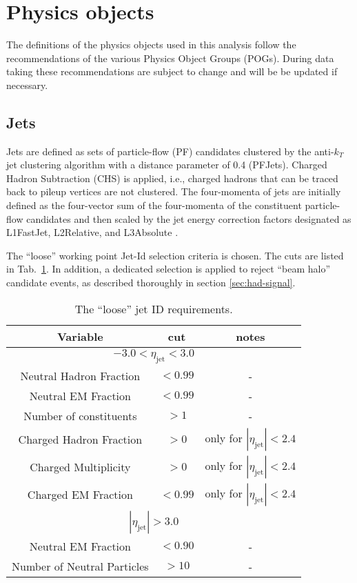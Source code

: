 \section{Physics objects}
\label{sec:objects}
The definitions of the physics objects used in this analysis follow the recommendations of the various Physics Object Groups (POGs). 
During data taking these recommendations are subject to change and will be be updated if necessary.

\subsection{Jets}
\label{sec:jetreco}
Jets are defined as sets of particle-flow (PF) candidates clustered by the
anti-$k_{T}$ jet clustering algorithm \cite{Cacciari:2008gp} with a distance parameter of 0.4
(PFJets). Charged Hadron Subtraction (CHS) is applied, i.e., charged
hadrons that can be traced back to pileup vertices are not clustered.
The four-momenta of jets are initially defined as the four-vector sum of
the four-momenta of the constituent particle-flow candidates and then
scaled by the jet energy correction factors designated as L1FastJet,
L2Relative, and L3Absolute \cite{Chatrchyan:2011ds}.

The ``loose'' working point Jet-Id selection criteria is chosen. 
The cuts are listed in Tab.~\ref{tab:loose-jet-id}. 
In addition, a dedicated selection is applied to reject ``beam halo'' candidate events, 
as described thoroughly in section \ref{sec:had-signal}.

\begin{table}[ht!]
  \caption{The ``loose'' jet ID requirements. \label{tab:loose-jet-id}}
  \centering
  \begin{tabular}{ ccc }
    \hline
    \hline
    Variable & cut & notes \\ \hline
    \multicolumn{3}{c}{$-3.0 < \eta_{\mathrm{jet}} < 3.0$} \\ \hline    
    Neutral Hadron Fraction & $<0.99$ & - \\
    Neutral EM Fraction & $<0.99$ & - \\
    Number of constituents & $>1$ & - \\
    Charged Hadron Fraction & $>0$ & only for $|\eta_{\mathrm{jet}}| < 2.4$ \\
    Charged Multiplicity & $>0$ & only for $|\eta_{\mathrm{jet}}| < 2.4$ \\
    Charged EM Fraction & $<0.99$ & only for $|\eta_{\mathrm{jet}}| < 2.4$ \\ \hline
    \multicolumn{3}{c}{$|\eta_{\mathrm{jet}}| > 3.0$} \\ \hline        
    Neutral EM Fraction & $<0.90$ & - \\
    Number of Neutral Particles & $>10$ & - \\
    \hline
    \hline
  \end{tabular}
\end{table}

